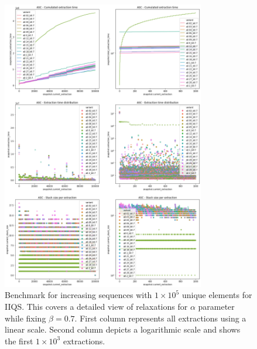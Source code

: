 \begin{figure}[p]
    \centering
    \includegraphics[width=0.79\textwidth]{./fragments/04_experimental_execution/images/04_alphabeta_detail_increasing_left.png}
    \caption{Benchmark for increasing sequences with $1\times10^5$ unique elements for IIQS. This covers a detailed view of relaxations for $\alpha$ parameter while fixing $\beta=0.7$. First column represents all extractions using a linear scale. Second column depicts a logarithmic scale and shows the first $1\times10^3$ extractions. }
    \label{FIG:05_ALPHABETA_BENCHMARK_ASC_LEFT}
\end{figure}

